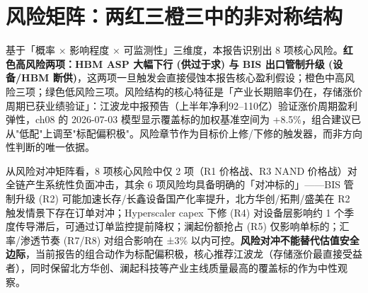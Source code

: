 
\section{风险矩阵：两红三橙三中的非对称结构}

基于「概率 × 影响程度 × 可监测性」三维度，本报告识别出 8 项核心风险。\textbf{红色高风险两项：HBM ASP 大幅下行 (供过于求) 与 BIS 出口管制升级 (设备/HBM 断供)}，这两项一旦触发会直接侵蚀本报告核心盈利假设；橙色中高风险三项；绿色低风险三项。风险结构的核心特征是「产业长期赔率仍在，存储涨价周期已获业绩验证」：江波龙中报预告（上半年净利92--110亿）验证涨价周期盈利弹性，ch08 的 2026-07-03 模型显示覆盖标的加权基准空间为 +8.5\%，组合建议已从"低配"上调至"标配偏积极"。风险章节作为目标价上修/下修的触发器，而非方向性判断的唯一依据。

从风险对冲矩阵看，8 项核心风险中仅 2 项（R1 价格战、R3 NAND 价格战）对全链产生系统性负面冲击，其余 6 项风险均具备明确的「对冲标的」——BIS 管制升级 (R2) 可能加速长存\slash 长鑫设备国产化率提升，北方华创/拓荆/盛美在 R2 触发情景下存在订单对冲；Hyperscaler capex 下修 (R4) 对设备层影响约 1 个季度传导滞后，可通过订单监控提前降权；澜起份额抢占 (R5) 仅影响单标的；汇率/渗透节奏 (R7/R8) 对组合影响在 ±3\% 以内可控。\textbf{风险对冲不能替代估值安全边际}，当前报告的组合动作为标配偏积极，核心推荐江波龙（存储涨价最直接受益者），同时保留北方华创、澜起科技等产业主线质量最高的覆盖标的作为中性观察。

